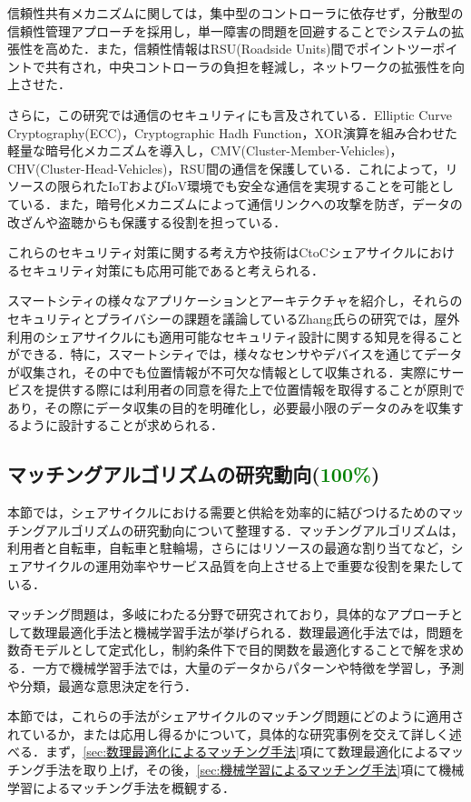           \par 信頼性共有メカニズムに関しては，集中型のコントローラに依存せず，分散型の信頼性管理アプローチを採用し，単一障害の問題を回避することでシステムの拡張性を高めた．また，信頼性情報はRSU(Roadside Units)間でポイントツーポイントで共有され，中央コントローラの負担を軽減し，ネットワークの拡張性を向上させた．
          \par さらに，この研究では通信のセキュリティにも言及されている．Elliptic Curve Cryptography(ECC)，Cryptographic Hadh Function，XOR演算を組み合わせた軽量な暗号化メカニズムを導入し，CMV(Cluster-Member-Vehicles)，CHV(Cluster-Head-Vehicles)，RSU間の通信を保護している．これによって，リソースの限られたIoTおよびIoV環境でも安全な通信を実現することを可能としている．また，暗号化メカニズムによって通信リンクへの攻撃を防ぎ，データの改ざんや盗聴からも保護する役割を担っている．
          \par これらのセキュリティ対策に関する考え方や技術はCtoCシェアサイクルにおけるセキュリティ対策にも応用可能であると考えられる．
          \par スマートシティの様々なアプリケーションとアーキテクチャを紹介し，それらのセキュリティとプライバシーの課題を議論しているZhang氏らの研究では，屋外利用のシェアサイクルにも適用可能なセキュリティ設計に関する知見を得ることができる．特に，スマートシティでは，様々なセンサやデバイスを通じてデータが収集され，その中でも位置情報が不可欠な情報として収集される．実際にサービスを提供する際には利用者の同意を得た上で位置情報を取得することが原則であり，その際にデータ収集の目的を明確化し，必要最小限のデータのみを収集するように設計することが求められる．
          
  
  \subsection{マッチングアルゴリズムの研究動向(\textcolor{green}{100\%})}
    \label{sec:マッチングアルゴリズムの研究動向}
      \par 本節では，シェアサイクルにおける需要と供給を効率的に結びつけるためのマッチングアルゴリズムの研究動向について整理する．マッチングアルゴリズムは，利用者と自転車，自転車と駐輪場，さらにはリソースの最適な割り当てなど，シェアサイクルの運用効率やサービス品質を向上させる上で重要な役割を果たしている．
      \par マッチング問題は，多岐にわたる分野で研究されており，具体的なアプローチとして数理最適化手法と機械学習手法が挙げられる．数理最適化手法では，問題を数奇モデルとして定式化し，制約条件下で目的関数を最適化することで解を求める．一方で機械学習手法では，大量のデータからパターンや特徴を学習し，予測や分類，最適な意思決定を行う．
      \par 本節では，これらの手法がシェアサイクルのマッチング問題にどのように適用されているか，または応用し得るかについて，具体的な研究事例を交えて詳しく述べる．まず，\ref{sec:数理最適化によるマッチング手法}項にて数理最適化によるマッチング手法を取り上げ，その後，\ref{sec:機械学習によるマッチング手法}項にて機械学習によるマッチング手法を概観する．

